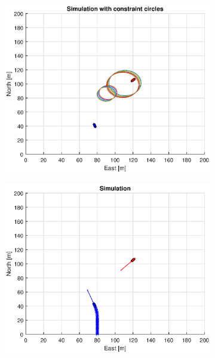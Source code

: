 \begin{figure}[!b]
\begin{subfigure}[b]{0.499\textwidth}
    \end{subfigure}
    \hfill
    \\
    \begin{subfigure}[b]{0.49\textwidth}
        \centering
        \includegraphics[width=\textwidth]{Images/Figures/sving_GW/Simple1_f1_Frame3}
    \end{subfigure}
    \hfill
    \begin{subfigure}[b]{0.499\textwidth}
        \centering
        \includegraphics[width=\textwidth]{Images/Figures/sving_GW/Simple1_f600_Frame3}
    \end{subfigure}
    \hfill
\end{figure}%
